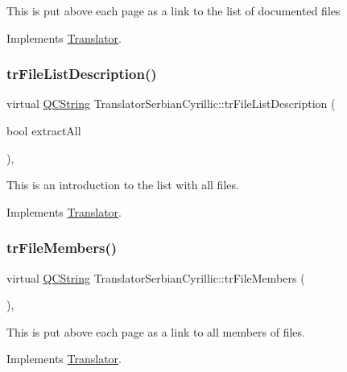This is put above each page as a link to the list of documented files 

Implements \mbox{\hyperlink{class_translator}{Translator}}.

\mbox{\label{class_translator_serbian_cyrillic_a00f6a31cf25bacaaa79faf331f05582c}} 
\subsubsection{\texorpdfstring{trFileListDescription()}{trFileListDescription()}}
{\footnotesize\ttfamily virtual \mbox{\hyperlink{class_q_c_string}{Q\+C\+String}} Translator\+Serbian\+Cyrillic\+::tr\+File\+List\+Description (\begin{DoxyParamCaption}\item[{bool}]{extract\+All }\end{DoxyParamCaption})\hspace{0.3cm}{\ttfamily [inline]}, {\ttfamily [virtual]}}

This is an introduction to the list with all files. 

Implements \mbox{\hyperlink{class_translator}{Translator}}.

\mbox{\label{class_translator_serbian_cyrillic_a63c7e24c62c4680abf0434c95ac608dd}} 
\subsubsection{\texorpdfstring{trFileMembers()}{trFileMembers()}}
{\footnotesize\ttfamily virtual \mbox{\hyperlink{class_q_c_string}{Q\+C\+String}} Translator\+Serbian\+Cyrillic\+::tr\+File\+Members (\begin{DoxyParamCaption}{ }\end{DoxyParamCaption})\hspace{0.3cm}{\ttfamily [inline]}, {\ttfamily [virtual]}}

This is put above each page as a link to all members of files. 

Implements \mbox{\hyperlink{class_translator}{Translator}}.


